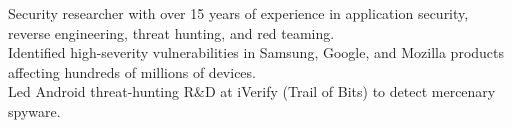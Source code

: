 \documentclass[10pt,a4paper,ragged2e,withhyper]{altacv}
\begin{document}


\makecvheader

\begin{center}
\small
\textcolor{body}{Security researcher with over 15 years of experience in application security, reverse engineering, threat hunting, and red teaming.\\Identified high-severity vulnerabilities in Samsung, Google, and Mozilla products affecting hundreds of millions of devices.\\Led Android threat-hunting R\&D at iVerify (Trail of Bits) to detect mercenary spyware.}
\end{center}

\end{document}
